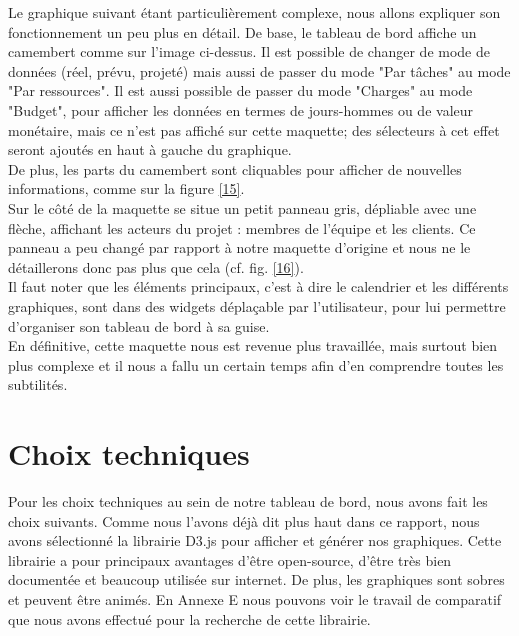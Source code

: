 \documentclass[12pt]{report}
\begin{document}
Le graphique suivant étant particulièrement complexe, nous allons expliquer son fonctionnement un peu plus en détail. De base, le tableau de bord affiche un camembert comme sur l'image ci-dessus. Il est possible de changer de mode de données (réel, prévu, projeté) mais aussi de passer du mode "Par tâches" au mode "Par ressources". Il est aussi possible de passer du mode "Charges" au mode "Budget", pour afficher les données en termes de jours-hommes ou de valeur monétaire, mais ce n'est pas affiché sur cette maquette; des sélecteurs à cet effet seront ajoutés en haut à gauche du graphique.\\

De plus, les parts du camembert sont cliquables pour afficher de nouvelles informations, comme sur la figure \ref{15}.\\

Sur le côté de la maquette se situe un petit panneau gris, dépliable avec une flèche, affichant les acteurs du projet : membres de l'équipe et les clients. Ce panneau a peu changé par rapport à notre maquette d'origine et nous ne le détaillerons donc pas plus que cela (cf. fig. \ref{16}).\\


Il faut noter que les éléments principaux, c'est à dire le calendrier et les différents graphiques, sont dans des widgets déplaçable par l'utilisateur, pour lui permettre d'organiser son tableau de bord à sa guise.\\


En définitive, cette maquette nous est revenue plus travaillée, mais surtout bien plus complexe et il nous a fallu un certain temps afin d'en comprendre toutes les subtilités.\\


	\section{Choix techniques}
	
	Pour les choix techniques au sein de notre tableau de bord, nous avons fait les choix suivants. Comme nous l’avons déjà dit plus haut dans ce rapport, nous avons sélectionné la librairie D3.js pour afficher et générer nos graphiques. Cette librairie a pour principaux avantages d’être open-source, d’être très bien documentée et beaucoup utilisée sur internet. De plus, les graphiques sont sobres et peuvent être animés. En Annexe E nous pouvons voir le travail de comparatif que nous avons effectué pour la recherche de cette librairie.\\
\end{document}
